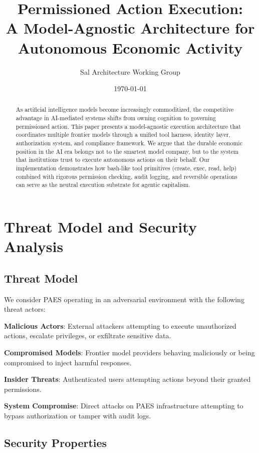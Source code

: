 \documentclass[11pt,a4paper]{article}
\title{Permissioned Action Execution: \\
\large A Model-Agnostic Architecture for Autonomous Economic Activity}
\author{Sal Architecture Working Group}
\date{\today}
\begin{document}
\maketitle

\begin{abstract}
As artificial intelligence models become increasingly commoditized, the competitive advantage in AI-mediated systems shifts from owning cognition to governing permissioned action. This paper presents a model-agnostic execution architecture that coordinates multiple frontier models through a unified tool harness, identity layer, authorization system, and compliance framework. We argue that the durable economic position in the AI era belongs not to the smartest model company, but to the system that institutions trust to execute autonomous actions on their behalf. Our implementation demonstrates how bash-like tool primitives (create, exec, read, help) combined with rigorous permission checking, audit logging, and reversible operations can serve as the neutral execution substrate for agentic capitalism.
\end{abstract}

\section{Threat Model and Security Analysis}

\subsection{Threat Model}

We consider PAES operating in an adversarial environment with the following threat actors:

\textbf{Malicious Actors}: External attackers attempting to execute unauthorized actions, escalate privileges, or exfiltrate sensitive data.

\textbf{Compromised Models}: Frontier model providers behaving maliciously or being compromised to inject harmful responses.

\textbf{Insider Threats}: Authenticated users attempting actions beyond their granted permissions.

\textbf{System Compromise}: Direct attacks on PAES infrastructure attempting to bypass authorization or tamper with audit logs.

\subsection{Security Properties}
\end{document}
